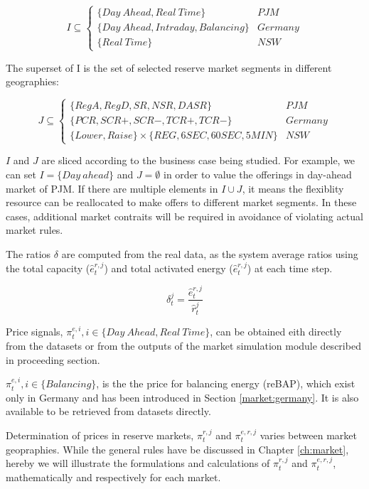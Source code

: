 \begin{equation*}
I \subseteq  \begin{cases}
\{Day~Ahead, Real~Time\} & PJM \\
\{Day~Ahead, Intraday, Balancing\} & Germany \\
\{Real~Time\} & NSW
\end{cases}
\end{equation*}

The superset of I is the set of selected reserve market segments in different geographies:

\begin{equation*}
J \subseteq  \begin{cases}
\{RegA, RegD, SR, NSR, DASR\} & PJM \\
\{PCR, SCR+, SCR-, TCR+, TCR-\} & Germany \\
\{Lower, Raise\} \times \{REG, 6SEC, 60SEC, 5MIN\} & NSW
\end{cases}
\end{equation*}

$I$ and $J$ are sliced according to the business case being studied. For example, we can set $I = \{Day~ahead\}$ and $J=\emptyset$ in order to value the offerings in day-ahead market of PJM. If there are multiple elements in $I \cup J$, it means the flexiblity resource can be reallocated to make offers to different market segments. In these cases, additional market contraits will be required in avoidance of violating actual market rules.

The ratios $\delta$ are computed from the real data, as the system average ratios using the total capacity ($\hat{e}_t^{r,j}$) and total activated energy ($\hat{e}_t^{r,j}$) at each time step.

\begin{equation*}
\delta_t^j = \frac{\hat{e}_t^{r,j}}{\hat{r}_t^j}
\end{equation*}

Price signals, $\pi_t^{e,i}, i \in \{Day~Ahead, Real~Time\}$, can be obtained eith directly from the datasets or from the outputs of the market simulation module described in proceeding section.

$\pi_t^{e,i}, i \in \{Balancing\}$, is the the price for balancing energy (reBAP), which exist only in Germany and has been introduced in Section \ref{market:germany}. It is also available to be retrieved from datasets directly.

Determination of prices in reserve markets, $\pi_t^{r,j}$ and $\pi_t^{e,r,j}$ varies between market geopraphies. While the general rules have be discussed in Chapter \ref{ch:market}, hereby we will illustrate the formulations and calculations of $\pi_t^{r,j}$ and $\pi_t^{e,r,j}$, mathematically and respectively for each market.


